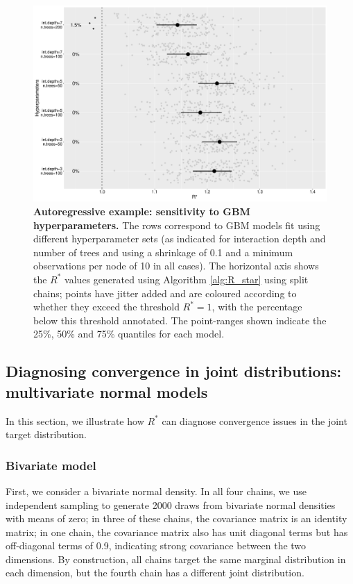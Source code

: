 \documentclass{article}
\begin{document}
\begin{figure}[!htb]
	\centerline{\includegraphics[width=1.0\textwidth]{../output/ar1_sensitivity.pdf}}
	\caption{\textbf{Autoregressive example: sensitivity to GBM hyperparameters.} The rows correspond to GBM models fit using different hyperparameter sets (as indicated for interaction depth and number of trees and using a shrinkage of 0.1 and a minimum observations per node of 10 in all cases). The horizontal axis shows the $R^*$ values generated using Algorithm \ref{alg:R_star} using split chains; points have jitter added and are coloured according to whether they exceed the threshold $R^*=1$, with the percentage below this threshold annotated. The point-ranges shown indicate the 25\%, 50\% and 75\% quantiles for each model.}
	\label{fig:ar1_sensitivity}
\end{figure}

\subsection{Diagnosing convergence in joint distributions: multivariate normal models}\label{sec:multivariate_normal}
In this section, we illustrate how $R^*$ can diagnose convergence issues in the joint target distribution.

\subsubsection{Bivariate model}\label{sec:multivariate_normal_bivariate}
First, we consider a bivariate normal density. In all four chains, we use independent sampling to generate 2000 draws from bivariate normal densities with means of zero; in three of these chains, the covariance matrix is an identity matrix; in one chain, the covariance matrix also has unit diagonal terms but has off-diagonal terms of 0.9, indicating strong covariance between the two dimensions. By construction, all chains target the same marginal distribution in each dimension, but the fourth chain has a different joint distribution.
\end{document}
